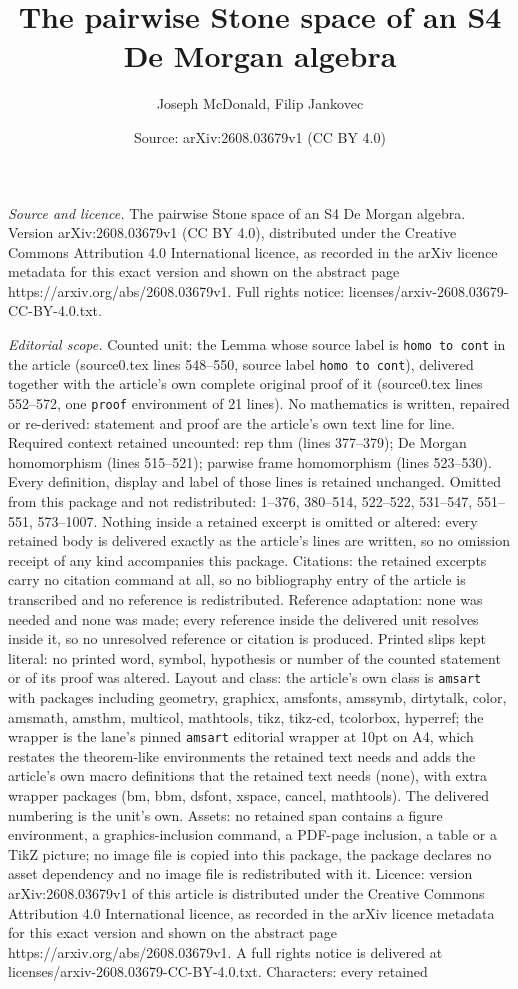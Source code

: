\documentclass[10pt,a4paper]{amsart}
\title[The pairwise Stone space of an S4 De Morgan algebra]{The pairwise Stone space of an S4 De Morgan algebra}
\author{Joseph McDonald, Filip Jankovec}
\date{Source: arXiv:2608.03679v1 (CC BY 4.0)}
\begin{document}
\maketitle

\noindent\emph{Source and licence.} The pairwise Stone space of an S4 De Morgan algebra. Version arXiv:2608.03679v1 (CC BY 4.0), distributed under the Creative Commons Attribution 4.0 International licence, as recorded in the arXiv licence metadata for this exact version and shown on the abstract page https://arxiv.org/abs/2608.03679v1. Full rights notice: licenses/arxiv-2608.03679-CC-BY-4.0.txt.\par\smallskip

\noindent\textit{Editorial scope.} Counted unit: the Lemma whose source label is \texttt{homo to cont} in the article (source0.tex lines 548--550, source label \texttt{homo to cont}), delivered together with the article's own complete original proof of it (source0.tex lines 552--572, one \texttt{proof} environment of 21 lines). No mathematics is written, repaired or re-derived: statement and proof are the article's own text line for line. Required context retained uncounted: rep thm (lines 377--379); De Morgan homomorphism (lines 515--521); parwise frame homomorphism (lines 523--530). Every definition, display and label of those lines is retained unchanged. Omitted from this package and not redistributed: 1--376, 380--514, 522--522, 531--547, 551--551, 573--1007. Nothing inside a retained excerpt is omitted or altered: every retained body is delivered exactly as the article's lines are written, so no omission receipt of any kind accompanies this package. Citations: the retained excerpts carry no citation command at all, so no bibliography entry of the article is transcribed and no reference is redistributed. Reference adaptation: none was needed and none was made; every reference inside the delivered unit resolves inside it, so no unresolved reference or citation is produced. Printed slips kept literal: no printed word, symbol, hypothesis or number of the counted statement or of its proof was altered. Layout and class: the article's own class is \texttt{amsart} with packages including geometry, graphicx, amsfonts, amssymb, dirtytalk, color, amsmath, amsthm, multicol, mathtools, tikz, tikz-cd, tcolorbox, hyperref; the wrapper is the lane's pinned \texttt{amsart} editorial wrapper at 10pt on A4, which restates the theorem-like environments the retained text needs and adds the article's own macro definitions that the retained text needs (none), with extra wrapper packages (bm, bbm, dsfont, xspace, cancel, mathtools). The delivered numbering is the unit's own. Assets: no retained span contains a figure environment, a graphics-inclusion command, a PDF-page inclusion, a table or a TikZ picture; no image file is copied into this package, the package declares no asset dependency and no image file is redistributed with it. Licence: version arXiv:2608.03679v1 of this article is distributed under the Creative Commons Attribution 4.0 International licence, as recorded in the arXiv licence metadata for this exact version and shown on the abstract page https://arxiv.org/abs/2608.03679v1. A full rights notice is delivered at licenses/arxiv-2608.03679-CC-BY-4.0.txt. Characters: every retained 
\end{document}
